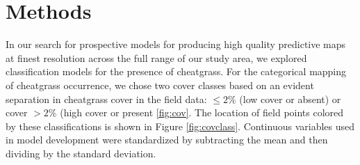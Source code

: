 \def\year{2017}\relax \documentclass[letterpaper]{article}
\begin{document}
\section{Methods}
In our search for prospective models for producing high quality predictive maps at finest resolution across the full range of our study area, we explored classification models for the presence of cheatgrass. For the categorical mapping of cheatgrass
occurrence, we chose two cover classes based on an evident separation in cheatgrass cover in the field
data: $≤ 2\%$ (low cover or absent) or cover $> 2\%$ (high cover or present \ref{fig:cov}. 
The location of field points colored by these classifications is shown in Figure \ref{fig:covclass}. Continuous variables used in model development were standardized by subtracting the mean and then dividing
by the standard deviation. 
\end{document}
